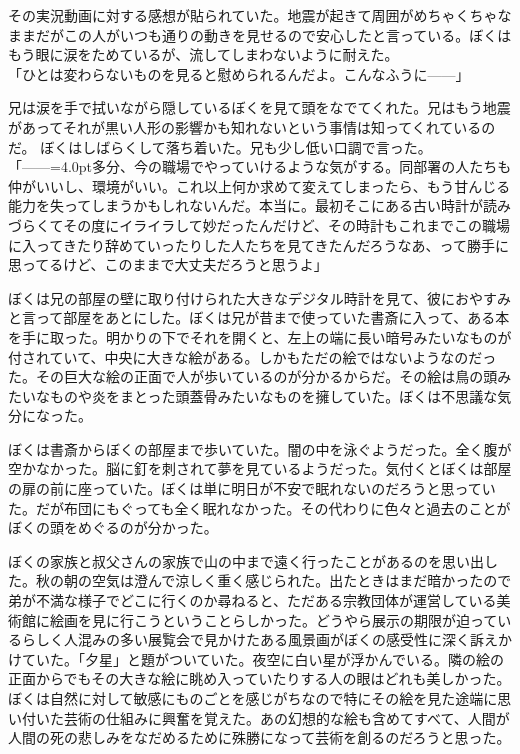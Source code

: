 \documentclass[b5j,twoside,twocolumn]{utarticle}
\begin{document}
その実況動画に対する感想が貼られていた。地震が起きて周囲がめちゃくちゃなままだがこの人がいつも通りの動きを見せるので安心したと言っている。ぼくはもう眼に涙をためているが、流してしまわないように耐えた。\\
「ひとは変わらないものを見ると慰められるんだよ。こんなふうに\tbaselineshift=2.5pt------\tbaselineshift=4.0pt」


兄は涙を手で拭いながら隠しているぼくを見て頭をなでてくれた。兄はもう地震があってそれが黒い人形の影響かも知れないという事情は知ってくれているのだ。
ぼくはしばらくして落ち着いた。兄も少し低い口調で言った。\\
「\tbaselineshift=2.5pt------\tbaselineshift=4.0pt多分、今の職場でやっていけるような気がする。同部署の人たちも仲がいいし、環境がいい。これ以上何か求めて変えてしまったら、もう甘んじる能力を失ってしまうかもしれないんだ。本当に。最初そこにある古い時計が読みづらくてその度にイライラして妙だったんだけど、その時計もこれまでこの職場に入ってきたり辞めていったりした人たちを見てきたんだろうなあ、って勝手に思ってるけど、このままで大丈夫だろうと思うよ」


ぼくは兄の部屋の壁に取り付けられた大きなデジタル時計を見て、彼におやすみと言って部屋をあとにした。ぼくは兄が昔まで使っていた書斎に入って、ある本を手に取った。明かりの下でそれを開くと、左上の端に長い暗号みたいなものが付されていて、中央に大きな絵がある。しかもただの絵ではないようなのだった。その巨大な絵の正面で人が歩いているのが分かるからだ。その絵は鳥の頭みたいなものや炎をまとった頭蓋骨みたいなものを擁していた。ぼくは不思議な気分になった。


ぼくは書斎からぼくの部屋まで歩いていた。闇の中を泳ぐようだった。全く腹が空かなかった。脳に釘を刺されて夢を見ているようだった。気付くとぼくは部屋の扉の前に座っていた。ぼくは単に明日が不安で眠れないのだろうと思っていた。だが布団にもぐっても全く眠れなかった。その代わりに色々と過去のことがぼくの頭をめぐるのが分かった。


ぼくの家族と叔父さんの家族で山の中まで遠く行ったことがあるのを思い出した。秋の朝の空気は澄んで涼しく重く感じられた。出たときはまだ暗かったので弟が不満な様子でどこに行くのか尋ねると、ただある宗教団体が運営している美術館に絵画を見に行こうということらしかった。どうやら展示の期限が迫っているらしく人混みの多い展覧会で見かけたある風景画がぼくの感受性に深く訴えかけていた。「夕星」と題がついていた。夜空に白い星が浮かんでいる。隣の絵の正面からでもその大きな絵に眺め入っていたりする人の眼はどれも美しかった。ぼくは自然に対して敏感にものごとを感じがちなので特にその絵を見た途端に思い付いた芸術の仕組みに興奮を覚えた。あの幻想的な絵も含めてすべて、人間が人間の死の悲しみをなだめるために殊勝になって芸術を創るのだろうと思った。
\end{document}
